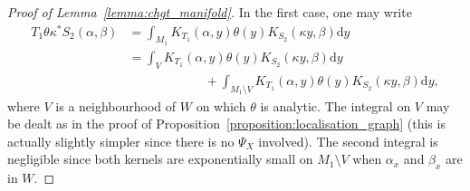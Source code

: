\documentclass[10pt]{amsart}
\theoremstyle{definition}\newtheorem{defi}[theo]{Definition}\newtheorem{rema}[theo]{Remark}\newtheorem{exam}[theo]{Example}\newtheorem{exem}[theo]{Example}\newtheorem{nota}[theo]{Notation}
\newcommand{\rmd}{\mathrm{d}}
\begin{document}
\begin{proof}[Proof of Lemma~\ref{lemma:chgt_manifold}]
In the first case, one may write
\begin{equation*}
\begin{split}
T_1 \theta \kappa^* S_2(\alpha,\beta) & = \int_{M_1} K_{T_1}(\alpha,y) \theta(y) K_{S_2}(\kappa y, \beta) \rmd y \\
& = \int_{V} K_{T_1}(\alpha,y) \theta(y) K_{S_2}(\kappa y, \beta) \rmd y \\ & \qquad \qquad \qquad + \int_{M_1 \setminus V} K_{T_1}(\alpha,y) \theta(y) K_{S_2}(\kappa y, \beta) \rmd y,
\end{split}
\end{equation*}
where $V$ is a neighbourhood of $W$ on which $\theta$ is analytic. The integral on $V$ may be dealt as in the proof of Proposition~\ref{proposition:localisation_graph} (this is actually slightly simpler since there is no $\Psi_X$ involved). The second integral is negligible since both kernels are exponentially small on $M_1 \setminus V$ when $\alpha_x$ and $\beta_x$ are in $W$.


\end{proof}
\end{document}
